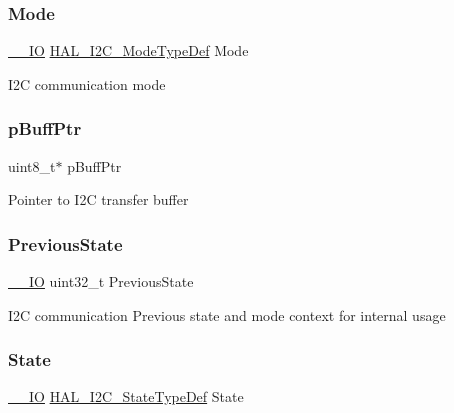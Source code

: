 \subsubsection{\texorpdfstring{Mode}{Mode}}
{\footnotesize\ttfamily \mbox{\hyperlink{core__sc300_8h_aec43007d9998a0a0e01faede4133d6be}{\+\_\+\+\_\+\+IO}} \mbox{\hyperlink{group___i2_c___exported___types_gabcbb7b844f2ffd63c4e530c117882062}{H\+A\+L\+\_\+\+I2\+C\+\_\+\+Mode\+Type\+Def}} Mode}

I2C communication mode \mbox{\label{struct_i2_c___handle_type_def_ae5b117ad14c78eb266b018fb972e315e}} 
\subsubsection{\texorpdfstring{p\+Buff\+Ptr}{pBuffPtr}}
{\footnotesize\ttfamily uint8\+\_\+t$\ast$ p\+Buff\+Ptr}

Pointer to I2C transfer buffer \mbox{\label{struct_i2_c___handle_type_def_aa74abfd1a56073ae8c2c826db1be0628}} 
\subsubsection{\texorpdfstring{Previous\+State}{PreviousState}}
{\footnotesize\ttfamily \mbox{\hyperlink{core__sc300_8h_aec43007d9998a0a0e01faede4133d6be}{\+\_\+\+\_\+\+IO}} uint32\+\_\+t Previous\+State}

I2C communication Previous state and mode context for internal usage \mbox{\label{struct_i2_c___handle_type_def_a48237f31888af06f6c25dead5438f5a7}} 
\subsubsection{\texorpdfstring{State}{State}}
{\footnotesize\ttfamily \mbox{\hyperlink{core__sc300_8h_aec43007d9998a0a0e01faede4133d6be}{\+\_\+\+\_\+\+IO}} \mbox{\hyperlink{group___i2_c___exported___types_gaef355af8eab251ae2a19ee164ad81c37}{H\+A\+L\+\_\+\+I2\+C\+\_\+\+State\+Type\+Def}} State}

